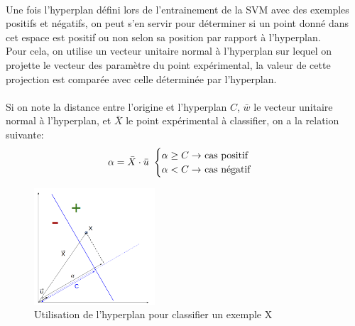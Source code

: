 \documentclass[12pt]{article}
\begin{document}
\\
Une fois l'hyperplan défini lors de l'entrainement de la SVM avec des exemples positifs et négatifs, on peut s'en servir pour déterminer si un point donné dans cet espace est positif ou non selon sa position par rapport à l'hyperplan.\\
Pour cela, on utilise un vecteur unitaire normal à l'hyperplan sur lequel on projette le vecteur des paramètre du point expérimental, la valeur de cette projection est comparée avec celle déterminée par l'hyperplan.\\\\
Si on note la distance entre l'origine et l'hyperplan $C$, $\bar{w}$ le vecteur unitaire normal à l'hyperplan, et $\bar{X}$ le point expérimental à classifier, on a la relation suivante:
\[\alpha=\bar{X}\cdot\bar{u}~
\begin{cases}
\alpha\geq C\rightarrow~$cas positif$\\
\alpha<C\rightarrow~$cas négatif$
\end{cases}
\]
\begin{figure}[!ht]
    \centering
	    \includegraphics[width=0.4\textwidth]{img/projection.png}
	    \caption{Utilisation de l'hyperplan pour classifier un exemple X}
        \label{fig:projection}
\end{figure}
\end{document}
